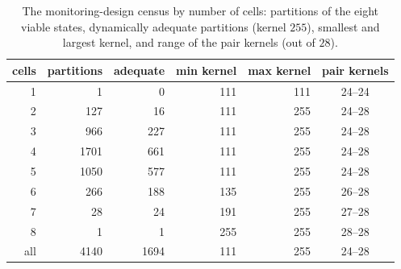\begin{table}[t]
\centering\small
\caption{The monitoring-design census by number of cells: partitions of the eight viable states, dynamically adequate partitions (kernel $255$), smallest and largest kernel, and range of the pair kernels (out of $28$).}
\label{tab:design}
\begin{tabular}{rrrrrc}
\toprule
cells & partitions & adequate & min kernel & max kernel & pair kernels \\
\midrule
1 & 1 & 0 & 111 & 111 & 24--24 \\
2 & 127 & 16 & 111 & 255 & 24--28 \\
3 & 966 & 227 & 111 & 255 & 24--28 \\
4 & 1701 & 661 & 111 & 255 & 24--28 \\
5 & 1050 & 577 & 111 & 255 & 24--28 \\
6 & 266 & 188 & 135 & 255 & 26--28 \\
7 & 28 & 24 & 191 & 255 & 27--28 \\
8 & 1 & 1 & 255 & 255 & 28--28 \\
\midrule
all & 4140 & 1694 & 111 & 255 & 24--28 \\
\bottomrule
\end{tabular}
\end{table}

